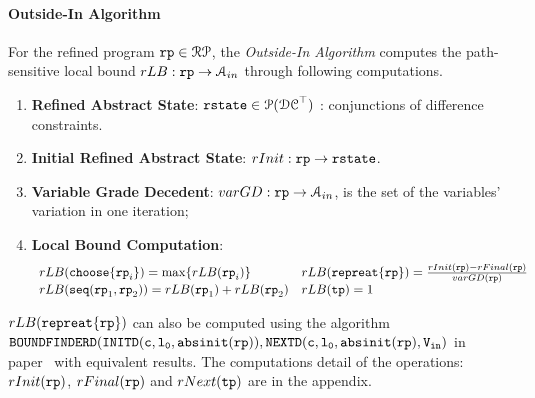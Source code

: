 \paragraph*{Outside-In Algorithm}
For the refined program $\mathtt{rp} \in \mathcal{RP}$, the \emph{Outside-In Algorithm}
computes the path-sensitive local bound 
$rLB: \mathtt{rp} \to \mathcal{A}_{in}$ through following computations.
\begin{enumerate}
\item \textbf{{Refined Abstract State}}: 
$\mathtt{rstate} \in \mathcal{P}(\mathcal{DC}^{\top})$ : conjunctions of difference constraints.
\item  \textbf{Initial Refined Abstract State}: $rInit : \mathtt{rp} \to \mathtt{rstate} $.
\item \textbf{Variable Grade Decedent}: $varGD : \mathtt{rp} \to \mathcal{A}_{in}$, is the set of the variables' variation in one iteration;
\item \textbf{Local Bound Computation}: 
\[
  \begin{array}{ll}
    rLB(\mathtt{choose}\{\mathtt{rp}_i\}) =  \max\{rLB(\mathtt{rp}_i)\}
    &
    rLB(\mathtt{repreat}\{\mathtt{rp}\}) =  \frac{rInit(\mathtt{rp}) - rFinal(\mathtt{rp})}{varGD(\mathtt{rp})}
    \\
    rLB(\mathtt{seq}(\mathtt{rp}_1, \mathtt{rp}_2)) =  rLB(\mathtt{rp}_1)+ rLB( \mathtt{rp}_2)
    &
    rLB(\mathtt{tp}) =  1
  \end{array}
\]
\end{enumerate}
$rLB(\mathtt{repreat}\{\mathtt{rp}\})$ can also be computed using the algorithm 
$\mathtt{BOUNDFINDERD(INITD(c, l_0, \mathtt{abs}{\mathtt{init}}(\mathtt{rp})), NEXTD(c, l_0, \mathtt{abs}{\mathtt{init}}(\mathtt{rp}), V_{\mathtt{in}} )}$ 
in paper~\cite{GulwaniJK09} with equivalent results.
The computations detail of the operations: $rInit(\mathtt{rp})$,
$rFinal(\mathtt{rp})$ and $rNext(\mathtt{tp})$
are in the appendix.
